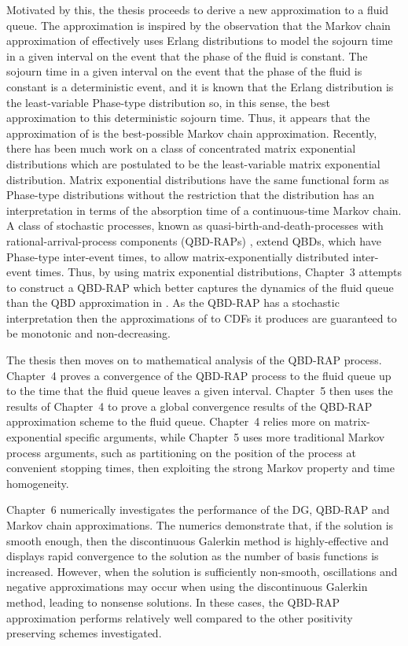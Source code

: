 \documentclass[a4paper]{article}
\begin{document}
Motivated by this, the thesis proceeds to derive a new approximation to a fluid queue. The approximation is inspired by the observation that the Markov chain approximation of \cite{bo2013} effectively uses Erlang distributions to model the sojourn time in a given interval on the event that the phase of the fluid is constant. The sojourn time in a given interval on the event that the phase of the fluid is constant is a deterministic event, and it is known that the Erlang distribution is the least-variable Phase-type distribution so, in this sense, the best approximation to this deterministic sojourn time. Thus, it appears that the approximation of \cite{bo2013} is the best-possible Markov chain approximation. Recently, there has been much work on a class of concentrated matrix exponential distributions \cite{hhat2020} which are postulated to be the least-variable matrix exponential distribution. Matrix exponential distributions have the same functional form as Phase-type distributions without the restriction that the distribution has an interpretation in terms of the absorption time of a continuous-time Markov chain. A class of stochastic processes, known as quasi-birth-and-death-processes with rational-arrival-process components (QBD-RAPs) \cite{bn2010}, extend QBDs, which have Phase-type inter-event times, to allow matrix-exponentially distributed inter-event times. Thus, by using matrix exponential distributions, Chapter~3 attempts to construct a QBD-RAP which better captures the dynamics of the fluid queue than the QBD approximation in \cite{bo2013}. As the QBD-RAP has a stochastic interpretation then the approximations of to CDFs it produces are guaranteed to be monotonic and non-decreasing.

The thesis then moves on to mathematical analysis of the QBD-RAP process. Chapter~4 proves a convergence of the QBD-RAP process to the fluid queue up to the time that the fluid queue leaves a given interval. Chapter~5 then uses the results of Chapter~4 to prove a global convergence results of the QBD-RAP approximation scheme to the fluid queue. Chapter~4 relies more on matrix-exponential specific arguments, while Chapter~5 uses more traditional Markov process arguments, such as partitioning on the position of the process at convenient stopping times, then exploiting the strong Markov property and time homogeneity. 

Chapter~6 numerically investigates the performance of the DG, QBD-RAP and Markov chain approximations. The numerics demonstrate that, if the solution is smooth enough, then the discontinuous Galerkin method is highly-effective and displays rapid convergence to the solution as the number of basis functions is increased. However, when the solution is sufficiently non-smooth, oscillations and negative approximations may occur when using the discontinuous Galerkin method, leading to nonsense solutions. In these cases, the QBD-RAP approximation performs relatively well compared to the other positivity preserving schemes investigated.
\end{document}
